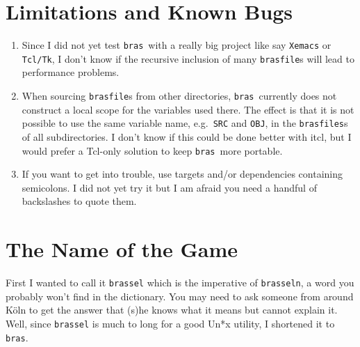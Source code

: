 \documentclass[12pt]{article}
\newcommand{\bras}{\texttt{bras}}
\begin{document}
\section{Limitations and Known Bugs}


\begin{enumerate}
\item
Since I did not yet test \bras\ with a really big project like say
\texttt{Xemacs} or \texttt{Tcl/Tk}, I don't know if the recursive
inclusion of many \texttt{brasfile}s will lead to performance
problems.

\item
When sourcing \texttt{brasfile}s from other directories, \bras\
currently does not construct a local scope for the variables used
there. The effect is that it is not possible to use the same variable
name, e.g.\ \texttt{SRC} and \texttt{OBJ}, in the \texttt{brasfiles}s
of all subdirectories. I don't know if this could be done
better with itcl, but I would prefer a Tcl-only solution to keep
\bras\ more portable.

\item
If you want to get into trouble, use targets and/or dependencies
containing semicolons. I did not yet try it but I am afraid you need a
handful of backslashes to quote them.
\end{enumerate}

\section{The Name of the Game}

First I wanted to call it \texttt{brassel} which is the imperative of
\texttt{brasseln}, a word you probably won't find in the
dictionary. You may 
need to ask someone from around K\"oln to get the answer that (s)he
knows what it means but cannot explain it. Well, since \texttt{brassel} is
much to long for a good Un*x utility, I shortened it to \texttt{bras}.
    
\end{document}
